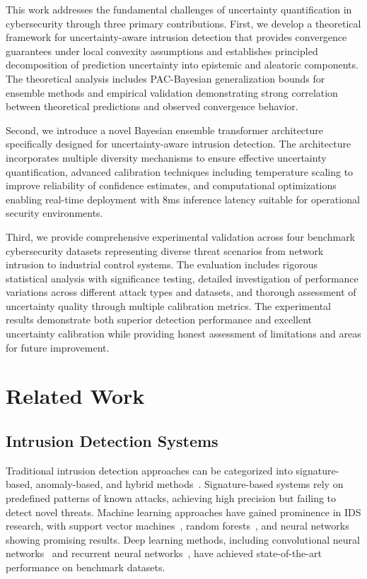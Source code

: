 \documentclass[journal]{IEEEtran}
\begin{document}
This work addresses the fundamental challenges of uncertainty quantification in cybersecurity through three primary contributions. First, we develop a theoretical framework for uncertainty-aware intrusion detection that provides convergence guarantees under local convexity assumptions and establishes principled decomposition of prediction uncertainty into epistemic and aleatoric components. The theoretical analysis includes PAC-Bayesian generalization bounds for ensemble methods and empirical validation demonstrating strong correlation between theoretical predictions and observed convergence behavior.

Second, we introduce a novel Bayesian ensemble transformer architecture specifically designed for uncertainty-aware intrusion detection. The architecture incorporates multiple diversity mechanisms to ensure effective uncertainty quantification, advanced calibration techniques including temperature scaling to improve reliability of confidence estimates, and computational optimizations enabling real-time deployment with 8ms inference latency suitable for operational security environments.

Third, we provide comprehensive experimental validation across four benchmark cybersecurity datasets representing diverse threat scenarios from network intrusion to industrial control systems. The evaluation includes rigorous statistical analysis with significance testing, detailed investigation of performance variations across different attack types and datasets, and thorough assessment of uncertainty quality through multiple calibration metrics. The experimental results demonstrate both superior detection performance and excellent uncertainty calibration while providing honest assessment of limitations and areas for future improvement.

\section{Related Work}

\subsection{Intrusion Detection Systems}

Traditional intrusion detection approaches can be categorized into signature-based, anomaly-based, and hybrid methods~\cite{garcia2014survey}. Signature-based systems rely on predefined patterns of known attacks, achieving high precision but failing to detect novel threats. Machine learning approaches have gained prominence in IDS research, with support vector machines~\cite{mukkamala2002intrusion}, random forests~\cite{breiman2001random}, and neural networks~\cite{cannady1998artificial} showing promising results. Deep learning methods, including convolutional neural networks~\cite{vinayakumar2017deep} and recurrent neural networks~\cite{yin2017deep}, have achieved state-of-the-art performance on benchmark datasets.
\end{document}
